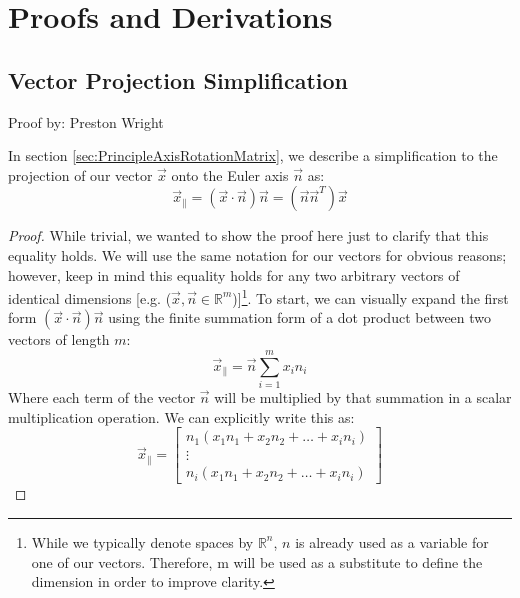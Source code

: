 \documentclass[12pt]{report}
\begin{document}
\section{Proofs and Derivations}\label{sec:ProofsAndDerivations}



\subsection{Vector Projection Simplification}\label{sec:VecProjectSimplify}
Proof by: Preston Wright

In section \ref{sec:PrincipleAxisRotationMatrix}, we describe a simplification to the projection of our vector $\vec{x}$ onto the \gls{Euler axis} $\vec{n}$ as:
$$\vec{x}_\parallel=(\vec{x}\cdot\vec{n})\vec{n}=(\vec{n}\vec{n}^T)\vec{x}$$
\begin{proof}
While trivial, we wanted to show the proof here just to clarify that this equality holds. We will use the same notation for our vectors for obvious reasons; however, keep in mind this equality holds for any two arbitrary vectors of identical dimensions [e.g. ($\vec{x},\vec{n}\in\mathbb{R}^m$)]\footnote{While we typically denote spaces by $\mathbb{R}^n$, $n$ is already used as a variable for one of our vectors. Therefore, m will be used as a substitute to define the dimension in order to improve clarity.}. To start, we can visually expand the first form $(\vec{x}\cdot\vec{n})\vec{n}$ using the finite summation form of a dot product between two vectors of length $m$: $$\vec{x}_\parallel=\vec{n}\sum_{i=1}^{m}{x_in_i}$$ 
Where each term of the vector $\vec{n}$ will be multiplied by that summation in a scalar multiplication operation. We can explicitly write this as:
$$\vec{x}_\parallel=\begin{bmatrix}
    n_1(x_1n_1+x_2n_2+\ldots+x_in_i)\\
    \vdots\\
    n_i(x_1n_1+x_2n_2+\ldots+x_in_i)
\end{bmatrix}$$


\end{proof}
\end{document}
